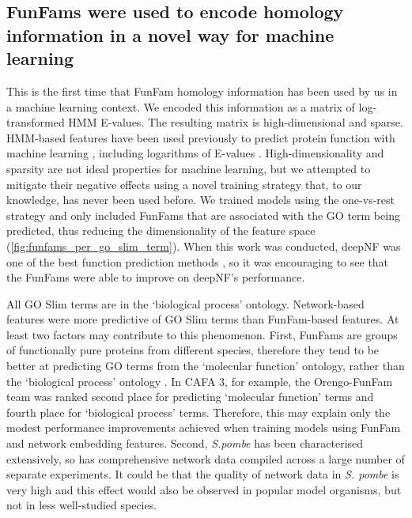 \subsection{FunFams were used to encode homology information in a novel way for machine learning}

This is the first time that FunFam homology information has been used by us in a machine learning context. We encoded this information as a matrix of log-transformed HMM E-values. The resulting matrix is high-dimensional and sparse. HMM-based features have been used previously to predict protein function with machine learning \cite{Cheng2006,Shah2008,Dlakic2009,Lees2017,Zaman2017}, including logarithms of E-values \cite{Cheng2006}. High-dimensionality and sparsity are not ideal properties for machine learning, but we attempted to mitigate their negative effects using a novel training strategy that, to our knowledge, has never been used before. We trained models using the one-vs-rest strategy and only included FunFams that are associated with the GO term being predicted, thus reducing the dimensionality of the feature space (\ref{fig:funfams_per_go_slim_term}). When this work was conducted, deepNF was one of the best function prediction methods \cite{Gligorijevic2018}, so it was encouraging to see that the FunFams were able to improve on deepNF's performance.

All GO Slim terms are in the `biological process' ontology. Network-based features were more predictive of GO Slim terms than FunFam-based features. At least two factors may contribute to this phenomenon. First, FunFams are groups of functionally pure proteins from different species, therefore they tend to be better at predicting GO terms from the `molecular function' ontology, rather than the `biological process' ontology \cite{Jiang2016,Zhou2019}. In CAFA 3, for example, the Orengo-FunFam team was ranked second place for predicting `molecular function' terms and fourth place for `biological process' terms. Therefore, this may explain only the modest performance improvements achieved when training models using FunFam and network embedding features. Second, \emph{S.pombe} has been characterised extensively, so has comprehensive network data compiled across a large number of separate experiments. It could be that the quality of network data in \emph{S. pombe} is very high and this effect would also be observed in popular model organisms, but not in less well-studied species.

